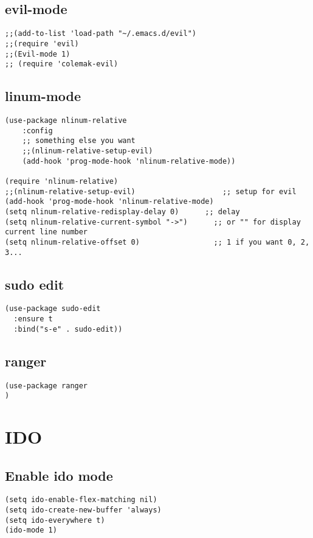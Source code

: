 \documentclass[11pt]{article}
\begin{document}
\subsection{evil-mode}
\label{sec-5-4}
\begin{verbatim}
;;(add-to-list 'load-path "~/.emacs.d/evil")
;;(require 'evil)
;;(Evil-mode 1)
;; (require 'colemak-evil)
\end{verbatim}
\subsection{linum-mode}
\label{sec-5-5}
\begin{verbatim}
(use-package nlinum-relative
    :config
    ;; something else you want
    ;;(nlinum-relative-setup-evil)
    (add-hook 'prog-mode-hook 'nlinum-relative-mode))

(require 'nlinum-relative)
;;(nlinum-relative-setup-evil)                    ;; setup for evil
(add-hook 'prog-mode-hook 'nlinum-relative-mode)
(setq nlinum-relative-redisplay-delay 0)      ;; delay
(setq nlinum-relative-current-symbol "->")      ;; or "" for display current line number
(setq nlinum-relative-offset 0)                 ;; 1 if you want 0, 2, 3...
\end{verbatim}
\subsection{sudo edit}
\label{sec-5-6}
\begin{verbatim}
(use-package sudo-edit
  :ensure t
  :bind("s-e" . sudo-edit))
\end{verbatim}
\subsection{ranger}
\label{sec-5-7}
\begin{verbatim}
(use-package ranger
)
\end{verbatim}
\section{IDO}
\label{sec-6}
\subsection{Enable ido mode}
\label{sec-6-1}
\begin{verbatim}
(setq ido-enable-flex-matching nil)
(setq ido-create-new-buffer 'always)
(setq ido-everywhere t)
(ido-mode 1)
\end{verbatim}
\end{document}
